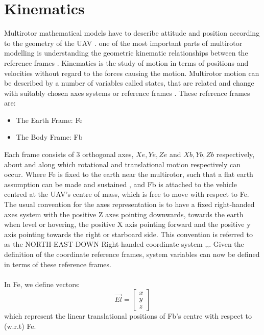 \documentclass[12pt,a4paper,twoside]{report}
\begin{document}
		\section{Kinematics}
			
			Multirotor mathematical models have to describe attitude and position according to the geometry of the UAV \cite{6}. one of the most important parts of multirotor modelling is understanding the geometric kinematic relationships between the reference frames \cite{8}. Kinematics is the study of motion in terms of positions and velocities without regard to the forces causing the motion. Multirotor motion can be described by a number of variables called states, that are related and change with suitably chosen axes systems or reference frames \cite{1}. These reference frames are:
				
			\begin{itemize}
				\item
					The Earth Frame: Fe
				\item 
					The Body Frame: Fb  
			\end{itemize}
			\space
			Each frame consists of 3 orthogonal axes, \(Xe,Ye,Ze\) and \(Xb,Yb,Zb\) respectively, about and along which rotational and translational motion respectively can occur. Where Fe is fixed to the earth near the multirotor, such that a flat earth assumption can be made and sustained \cite{2}, and Fb is attached to the vehicle centred at the UAV’s centre of mass, which is free to move with respect to Fe. The usual convention for the axes representation is to have a fixed right-handed axes system with the positive Z axes pointing downwards, towards the earth when level or hovering, the positive X axis pointing forward and the positive y axis pointing towards the right or starboard side. This convention is referred to as the NORTH-EAST-DOWN Right-handed coordinate system \cite{1},\cite{2},\cite{8}. Given the definition of the coordinate reference frames, system variables can now be defined in terms of these reference frames.
			\\ \\
			In Fe, we define vectors:
			\\
			\begin{equation}
				\vec{El} = 
				\begin{bmatrix}
					x \\
					y \\
					z
				\end{bmatrix}
			\end{equation}
			which represent the linear translational positions of Fb’s centre with respect to (w.r.t) Fe.
\end{document}
